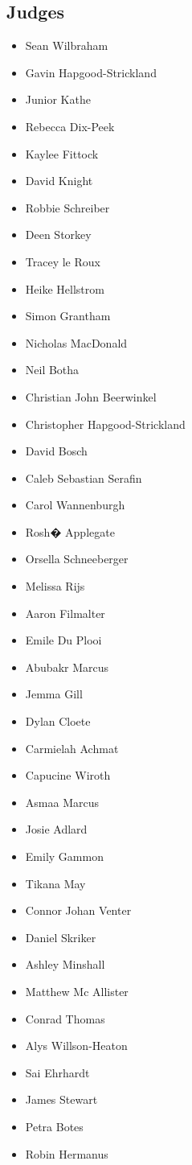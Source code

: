 \documentclass[10pt]{article}
\begin{document}
	\subsection*{Judges}
	\begin{itemize}

			\item Sean Wilbraham
			\item Gavin Hapgood-Strickland
			\item Junior Kathe
			\item Rebecca Dix-Peek
			\item Kaylee Fittock
			\item David Knight
			\item Robbie Schreiber
			\item Deen Storkey
			\item Tracey le Roux
			\item Heike Hellstrom
			\item Simon Grantham
			\item Nicholas MacDonald
			\item Neil Botha
			\item Christian John Beerwinkel
			\item Christopher Hapgood-Strickland
			\item David Bosch
			\item Caleb Sebastian Serafin
			\item Carol Wannenburgh
			\item Rosh� Applegate
			\item Orsella Schneeberger
			\item Melissa Rijs
			\item Aaron Filmalter
			\item Emile Du Plooi
			\item Abubakr Marcus
			\item Jemma Gill
			\item Dylan Cloete
			\item Carmielah Achmat
			\item Capucine Wiroth
			\item Asmaa Marcus
			\item Josie Adlard
			\item Emily Gammon
			\item Tikana May
			\item Connor Johan Venter
			\item Daniel Skriker
			\item Ashley Minshall
			\item Matthew Mc Allister
			\item Conrad Thomas
			\item Alys Willson-Heaton
			\item Sai Ehrhardt
			\item James Stewart
			\item Petra Botes
			\item Robin Hermanus
		\end{itemize}

	
\end{document}
